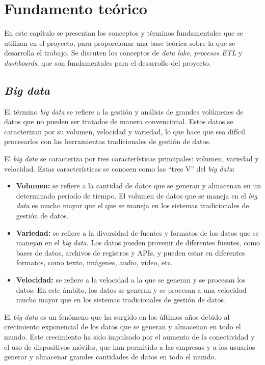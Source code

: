 \chapter{Fundamento teórico}\label{chap:teo}
En este capítulo se presentan los conceptos y términos fundamentales que se utilizan en el
proyecto, para proporcionar una base teórica sobre la que se desarrolla el trabajo. Se discuten
los conceptos de \textit{data lake}, \textit{procesos ETL} y \textit{dashboards}, que son
fundamentales para el desarrollo del proyecto.

\section{\textit{Big data}}\label{sec:bigdata}
El término \textit{big data} se refiere a la gestión y análisis de grandes volúmenes de datos
que no pueden ser tratados de manera convencional. Estos datos se caracterizan por su volumen,
velocidad y variedad, lo que hace que sea difícil procesarlos con las herramientas tradicionales
de gestión de datos.

El \textit{big data} se caracteriza por tres características principales: volumen, variedad y
velocidad. Estas características se conocen como las ``tres V'' del \textit{big data}:

\begin{itemize}
	\item \textbf{Volumen:} se refiere a la cantidad de datos que se generan y almacenan en un
		determinado periodo de tiempo. El volumen de datos que se maneja en el \textit{big data}
		es mucho mayor que el que se maneja en los sistemas tradicionales de gestión de datos.
	\item \textbf{Variedad:} se refiere a la diversidad de fuentes y formatos de los datos que
		se manejan en el \textit{big data}. Los datos pueden provenir de diferentes fuentes, como
		bases de datos, archivos de registros y APIs, y pueden estar en diferentes formatos, como
		texto, imágenes, audio, vídeo, etc.
	\item \textbf{Velocidad:} se refiere a la velocidad a la que se generan y se procesan los
		datos. En este ámbito, los datos se generan y se procesan a una velocidad mucho
		mayor que en los sistemas tradicionales de gestión de datos.
\end{itemize}

El \textit{big data} es un fenómeno que ha surgido en los últimos años debido al crecimiento
exponencial de los datos que se generan y almacenan en todo el mundo. Este crecimiento ha
sido impulsado por el aumento de la conectividad y el uso de dispositivos móviles, que han
permitido a las empresas y a los usuarios generar y almacenar grandes cantidades de datos
en todo el mundo.

